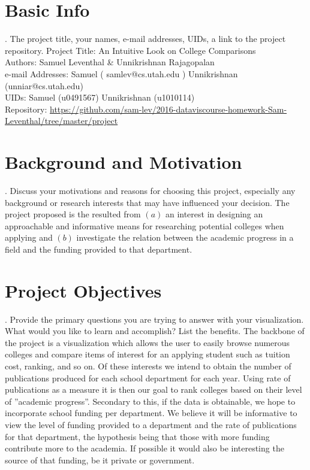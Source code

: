 \documentclass[11pt, a4paper]{article}
\begin{document}
\fi

\section{Basic Info}{. The project title, your names, e-mail addresses, UIDs, a link to the project repository.}
Project Title: An Intuitive Look on College Comparisons\\
Authors: Samuel Leventhal \& Unnikrishnan Rajagopalan\\
e-mail Addresses: Samuel ( samlev@cs.utah.edu ) Unnikrishnan (unniar@cs.utah.edu)\\
UIDs: Samuel (u0491567) Unnikrishnan (u1010114)\\
Repository: \href{https://github.com/sam-lev/2016-dataviscourse-homework-Sam-Leventhal/tree/master/project}{https://github.com/sam-lev/2016-dataviscourse-homework-Sam-Leventhal/tree/master/project}

\section{Background and Motivation}{. Discuss your motivations and reasons for choosing this project, especially any background or research interests that may have influenced your decision.}
The project proposed is the resulted from $(a)$ an interest in designing an approachable and informative means for researching potential colleges when applying and $(b)$ investigate the relation between the academic progress in a field and the funding provided to that department.

\section{Project Objectives}{. Provide the primary questions you are trying to answer with your visualization. What would you like to learn and accomplish? List the benefits.}
The backbone of the project is a visualization which allows the user to easily browse numerous colleges and compare items of interest for an applying student such as tuition cost, ranking, and so on. Of these interests we intend to obtain the number of publications produced for each school department for each year. Using rate of publications as a measure it is then our goal to rank colleges based on their level of ''academic progress''. Secondary to this, if the data is obtainable, we hope to incorporate school funding per department. We believe it will be informative to view the level of funding provided to a department and the rate of publications for that department, the hypothesis being that those with more funding contribute more to the academia. If possible it would also be interesting the source of that funding, be it private or government.
\end{document}
